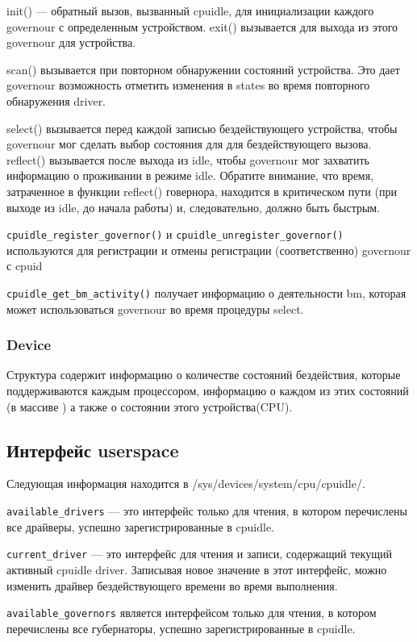 \documentclass{article}
\begin{document}
init() — обратный вызов, вызванный cpuidle, для инициализации каждого governour с определенным устройством. exit() вызывается для выхода из этого governour для устройства.

scan() вызывается при повторном обнаружении состояний устройства. Это дает governour возможность отметить изменения в states во время повторного обнаружения driver.

select() вызывается перед каждой записью бездействующего устройства, чтобы governour мог сделать выбор состояния для для бездействующего вызова. reflect() вызывается после выхода из idle, чтобы governour мог захватить информацию о проживании в режиме idle. Обратите внимание, что время, затраченное в функции reflect() говернора, находится в критическом пути (при выходе из idle, до начала работы) и, следовательно, должно быть быстрым.

\texttt{cpuidle\_register\_governor()}  и \texttt{cpuidle\_unregister\_governor()} используются для регистрации и отмены регистрации (соответственно) governour с cpuid

\texttt{cpuidle\_get\_bm\_activity()} получает информацию о деятельности bm, которая может использоваться governour во время процедуры select.

\subsubsection{Device}
Структура содержит информацию о количестве состояний бездействия, которые поддерживаются каждым процессором, информацию о каждом из этих состояний (в массиве ) а также о состоянии этого устройства(CPU).


\subsection{Интерфейс userspace}

Следующая информация находится в /sys/devices/system/cpu/cpuidle/.

\texttt{available\_drivers} — это интерфейс только для чтения, в котором перечислены все драйверы, успешно зарегистрированные в cpuidle.

\texttt{current\_driver} — это интерфейс для чтения и записи, содержащий текущий активный cpuidle driver. Записывая новое значение в этот интерфейс, можно изменить драйвер бездействующего времени во время выполнения.

\texttt{available\_governors} является интерфейсом только для чтения, в котором перечислены все губернаторы, успешно зарегистрированные в cpuidle.
\end{document}

